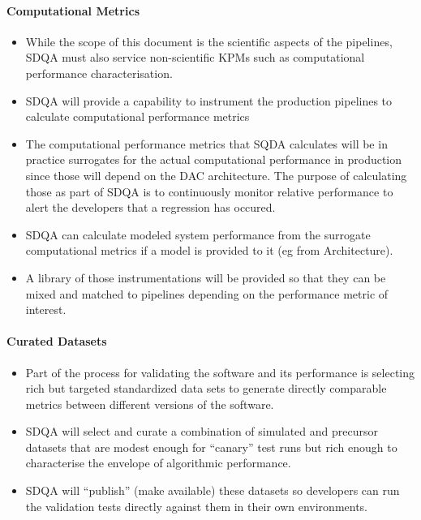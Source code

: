 \paragraph{Computational Metrics}
\label{sec:qaComputational}
\begin{itemize}

\item While the scope of this document is the scientific aspects of the pipelines, SDQA must also service non-scientific KPMs such as computational performance characterisation. 

\item SDQA will provide a capability to instrument the production  pipelines to calculate computational performance metrics

\item The computational performance metrics that SQDA calculates will be in practice surrogates for the actual computational performance in production since those will depend on the DAC architecture. The purpose of calculating those as part of SDQA is to continuously monitor relative performance to alert the developers that a regression has occured. 

\item SDQA can calculate modeled system performance from the surrogate computational metrics if a model is provided to it (eg from Architecture). 

\item A library of those instrumentations will be provided so that they can be mixed and matched to pipelines depending on the performance metric of interest. 

\end{itemize}


\paragraph{Curated Datasets}
\label{sec:qaCurateddata}
\begin{itemize}

\item Part of the process for validating the software and its performance is selecting rich but targeted standardized data sets to generate directly comparable metrics between different versions of the software. 

\item SDQA will select and curate a combination of simulated and precursor datasets that are modest enough for ``canary'' test runs but rich enough to characterise the envelope of algorithmic performance. 

\item SDQA will ``publish'' (make available) these datasets so developers can run the validation tests directly against them in their own environments. 

\end{itemize}


